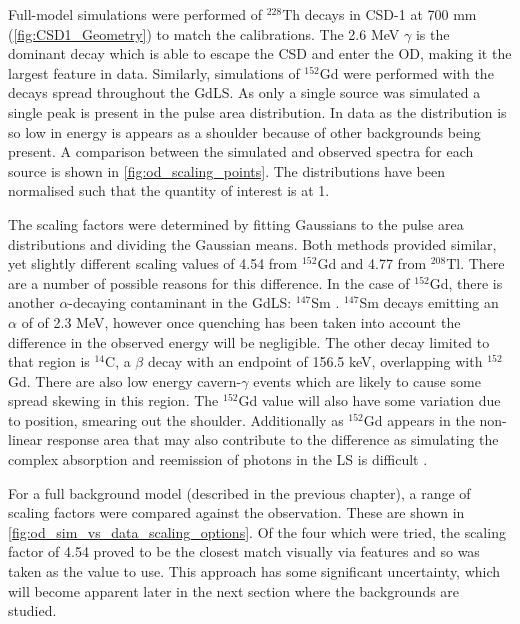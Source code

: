 \par
Full-model simulations were performed of ${}^{228}$Th decays in CSD-1 at 700 mm (\autoref{fig:CSD1_Geometry}) to match the calibrations.
The 2.6 MeV $\gamma$ is the dominant decay which is able to escape the CSD and enter the OD, making it the largest feature in data.
Similarly, simulations of ${}^{152}$Gd were performed with the decays spread throughout the GdLS.
As only a single source was simulated a single peak is present in the pulse area distribution.
In data as the distribution is so low in energy is appears as a shoulder because of other backgrounds being present.
A comparison between the simulated and observed spectra for each source is shown in \autoref{fig:od_scaling_points}.
The distributions have been normalised such that the quantity of interest is at 1.

\par
The scaling factors were determined by fitting Gaussians to the pulse area distributions and dividing the Gaussian means.
Both methods provided similar, yet slightly different scaling values of 4.54 from ${}^{152}$Gd and 4.77 from ${}^{208}$Tl.
There are a number of possible reasons for this difference.
In the case of ${}^{152}$Gd, there is another $\alpha$-decaying contaminant in the GdLS: ${}^{147}$Sm \cite{scotthaselschwardt_thesis_ref}.
${}^{147}$Sm decays emitting an $\alpha$ of of 2.3 MeV, however once quenching has been taken into account the difference in the observed energy will be negligible.
The other decay limited to that region is ${}^{14}$C, a $\beta$ decay with an endpoint of 156.5 keV, overlapping with ${}^{152}$Gd.
There are also low energy cavern-$\gamma$ events which are likely to cause some spread skewing in this region.
The ${}^{152}$Gd value will also have some variation due to position, smearing out the shoulder.
Additionally as ${}^{152}$Gd appears in the non-linear response area that may also contribute to the difference as simulating the complex absorption and reemission of photons in the LS is difficult \cite{ls_nonlinear_energy_response_ref}.

\par
For a full background model (described in the previous chapter), a range of scaling factors were compared against the observation.
These are shown in \autoref{fig:od_sim_vs_data_scaling_options}.
Of the four which were tried, the scaling factor of 4.54 proved to be the closest match visually via features and so was taken as the value to use.
This approach has some significant uncertainty, which will become apparent later in the next section where the backgrounds are studied.






